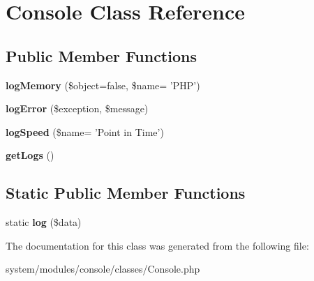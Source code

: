 \hypertarget{class_console}{
\section{Console Class Reference}
\label{class_console}
}
\subsection*{Public Member Functions}
\begin{DoxyCompactItemize}
\item 
\hypertarget{class_console_aa198d1e9851100d3a64e0f892376ced9}{
{\bfseries logMemory} (\$object=false, \$name= 'PHP')}
\label{class_console_aa198d1e9851100d3a64e0f892376ced9}

\item 
\hypertarget{class_console_ae644bfdfe373999ae23f3ae46285a4f8}{
{\bfseries logError} (\$exception, \$message)}
\label{class_console_ae644bfdfe373999ae23f3ae46285a4f8}

\item 
\hypertarget{class_console_a1e80b2050a94428d7d91a1ac5f856359}{
{\bfseries logSpeed} (\$name= 'Point in Time')}
\label{class_console_a1e80b2050a94428d7d91a1ac5f856359}

\item 
\hypertarget{class_console_a5a1b761c901432b2bfd7fc4e5e75a6bd}{
{\bfseries getLogs} ()}
\label{class_console_a5a1b761c901432b2bfd7fc4e5e75a6bd}

\end{DoxyCompactItemize}
\subsection*{Static Public Member Functions}
\begin{DoxyCompactItemize}
\item 
\hypertarget{class_console_a243a2f97359055e9464cb43cd36bfa1f}{
static {\bfseries log} (\$data)}
\label{class_console_a243a2f97359055e9464cb43cd36bfa1f}

\end{DoxyCompactItemize}


The documentation for this class was generated from the following file:\begin{DoxyCompactItemize}
\item 
system/modules/console/classes/Console.php\end{DoxyCompactItemize}

